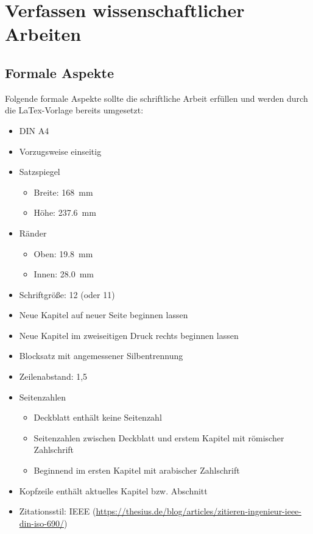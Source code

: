 \cleardoublepage
\chapter{Verfassen wissenschaftlicher Arbeiten}\label{ch:Wissenschaftliche_Arbeiten}

\section{Formale Aspekte}\label{sec:Formales}
Folgende formale Aspekte sollte die schriftliche Arbeit erfüllen und werden durch die LaTex-Vorlage bereits umgesetzt:
\begin{itemize}
	\item DIN A4
	\item Vorzugsweise einseitig
	\item Satzspiegel
	\begin{itemize}
		\item Breite: \SI{168}{\milli\meter}
		\item Höhe: \SI{237,6}{\milli\meter}
	\end{itemize}
	\item Ränder
	\begin{itemize}
		\item Oben: \SI{19,8}{\milli\meter}
		\item Innen: \SI{28,0}{\milli\meter}
	\end{itemize}
	\item Schriftgröße: 12 (oder 11)
	\item Neue Kapitel auf neuer Seite beginnen lassen
	\item Neue Kapitel im zweiseitigen Druck rechts beginnen lassen
	\item Blocksatz mit angemessener Silbentrennung
	\item Zeilenabstand: 1,5
	\item Seitenzahlen
	\begin{itemize}
		\item Deckblatt enthält keine Seitenzahl
		\item Seitenzahlen zwischen Deckblatt und erstem Kapitel mit römischer Zahlschrift
		\item Beginnend im ersten Kapitel mit arabischer Zahlschrift
	\end{itemize}
	\item Kopfzeile enthält aktuelles Kapitel bzw. Abschnitt
	\item Zitationsstil: IEEE (\url{https://thesius.de/blog/articles/zitieren-ingenieur-ieee-din-iso-690/})

\end{itemize}
